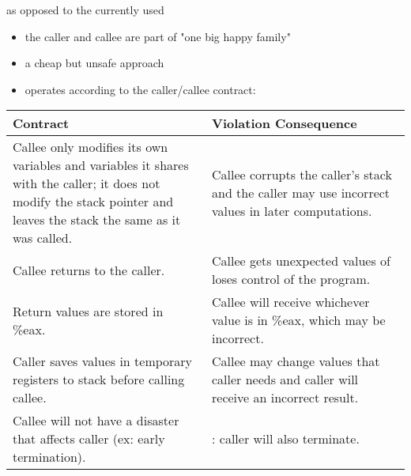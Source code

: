 \documentclass[../../lecture_notes.tex]{subfiles}
\begin{document}
as opposed to the currently used 
\begin{itemize}
\item the caller and callee are part of "one big happy family"
\item a cheap but unsafe approach
\item operates according to the caller/callee contract:
\end{itemize}
{\scriptsize
\def\arraystretch{1.5}
\begin{tabular}{ | p{0.5\linewidth} | p{0.5\linewidth} | }
	\hline
	\textbf{Contract} & \textbf{Violation Consequence} \\
	\hline
	Callee only modifies its own variables and variables it shares with the caller; it does not modify the stack pointer and leaves the stack the same as it was called. & Callee corrupts the caller's stack and the caller may use incorrect values in later computations.\\
	\hline
	Callee returns to the caller. & Callee gets unexpected values of loses control of the program. \\
	\hline
	Return values are stored in \%eax. & Callee will receive whichever value is in \%eax, which may be incorrect. \\
	\hline
	Caller saves values in temporary registers to stack before calling callee. & Callee may change values that caller needs and caller will receive an incorrect result. \\
	\hline
	Callee will not have a disaster that affects caller (ex: early termination). & \term{Fate Sharing}: caller will also terminate. \\
	\hline
\end{tabular}
}
\end{document}
